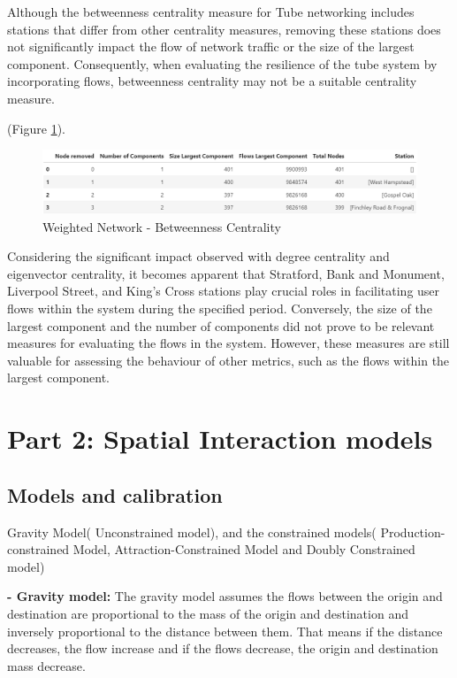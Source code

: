 \documentclass[10pt]{report}
\numberwithin{figure}{section}
\numberwithin{table}{section}
\begin{document}
Although the betweenness centrality measure for Tube networking includes stations that differ from other centrality measures, removing these stations does not significantly impact the flow of network traffic or the size of the largest component. Consequently, when evaluating the resilience of the tube system by incorporating flows, betweenness centrality may not be a suitable centrality measure.

(Figure \ref{fig:Table_Flows_Betweenness}). 
    \begin{figure}[htp]
        \centering
        \includegraphics[width=14cm]{Image/Table_Flows_Betweenness.png}
        \caption{Weighted Network - Betweenness Centrality}
        \label{fig:Table_Flows_Betweenness}
    \end{figure}

Considering the significant impact observed with degree centrality and eigenvector centrality, it becomes apparent that Stratford, Bank and Monument, Liverpool Street, and King's Cross stations play crucial roles in facilitating user flows within the system during the specified period. Conversely, the size of the largest component and the number of components did not prove to be relevant measures for evaluating the flows in the system. However, these measures are still valuable for assessing the behaviour of other metrics, such as the flows within the largest component.

\newpage 

\section{ Part 2: Spatial Interaction models}

\subsection{Models and calibration}

Gravity Model( Unconstrained model), and the constrained models( Production-constrained Model, Attraction-Constrained Model and Doubly Constrained model)

\vspace{5mm} %

\textbf{- Gravity model:}
The gravity model assumes the flows between the origin and destination are proportional to the mass of the origin and destination and inversely proportional to the distance between them. That means if the distance decreases, the flow increase and if the flows decrease, the origin and destination mass decrease.
\end{document}
